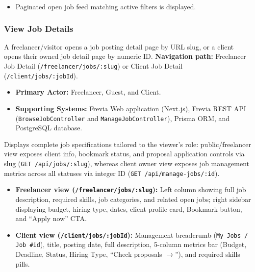 \begin{itemize}[leftmargin=1.6em,topsep=3pt,itemsep=2pt,parsep=0pt,label=$\bullet$]
    \item Paginated open job feed matching active filters is displayed.
\end{itemize}

\subsubsection{View Job Details}

A freelancer/visitor opens a job posting detail page by URL slug, or a client opens their owned job detail page by numeric ID.\newline
\textbf{Navigation path:} Freelancer Job Detail (\texttt{/freelancer/jobs/:slug}) or Client Job Detail (\texttt{/client/jobs/:jobId}).


\begin{itemize}[leftmargin=1.6em,topsep=3pt,itemsep=2pt,parsep=0pt,label=$\bullet$]
    \item \textbf{Primary Actor:} Freelancer, Guest, and Client.
    \item \textbf{Supporting Systems:} Frevia Web application (Next.js), Frevia REST API (\texttt{BrowseJobController} and \texttt{ManageJobController}), Prisma ORM, and PostgreSQL database.
\end{itemize}

\noindent Displays complete job specifications tailored to the viewer's role: public/freelancer view exposes client info, bookmark status, and proposal application controls via slug (\texttt{GET /api/jobs/:slug}), whereas client owner view exposes job management metrics across all statuses via integer ID (\texttt{GET /api/manage-jobs/:id}).

\begin{itemize}[leftmargin=1.6em,topsep=3pt,itemsep=2pt,parsep=0pt,label=$\bullet$]
    \item \textbf{Freelancer view (\texttt{/freelancer/jobs/:slug}):} Left column showing full job description, required skills, job categories, and related open jobs; right sidebar displaying budget, hiring type, dates, client profile card, Bookmark button, and ``Apply now'' CTA.
    \item \textbf{Client view (\texttt{/client/jobs/:jobId}):} Management breadcrumb (\texttt{My Jobs / Job \#id}), title, posting date, full description, 5-column metrics bar (Budget, Deadline, Status, Hiring Type, ``Check proposals $\rightarrow$''), and required skills pills.
\end{itemize}

